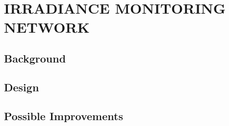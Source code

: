 \chapter{IRRADIANCE MONITORING NETWORK}
\label{chap:sens_net}

\section{Background}

\section{Design}

\section{Possible Improvements}

